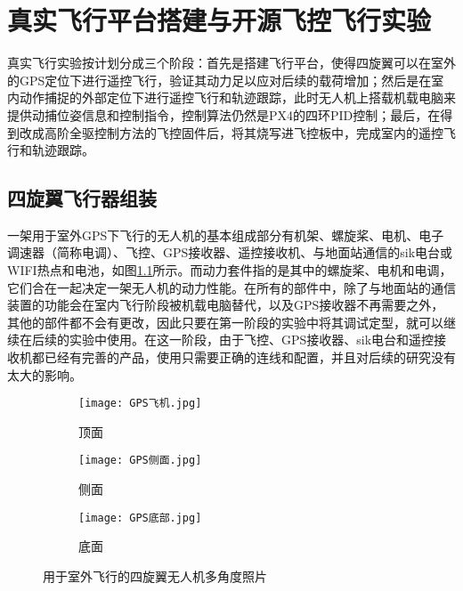 \chapter{真实飞行平台搭建与开源飞控飞行实验}
真实飞行实验按计划分成三个阶段：首先是搭建飞行平台，使得四旋翼可以在室外的GPS定位下进行遥控飞行，验证其动力足以应对后续的载荷增加；然后是在室内动作捕捉的外部定位下进行遥控飞行和轨迹跟踪，此时无人机上搭载机载电脑来提供动捕位姿信息和控制指令，控制算法仍然是PX4的四环PID控制；最后，在得到改成高阶全驱控制方法的飞控固件后，将其烧写进飞控板中，完成室内的遥控飞行和轨迹跟踪。
\section{四旋翼飞行器组装}
一架用于室外GPS下飞行的无人机的基本组成部分有机架、螺旋桨、电机、电子调速器（简称电调）、飞控、GPS接收器、遥控接收机、与地面站通信的sik电台或WIFI热点和电池，如图\ref{用于室外飞行的四旋翼无人机多角度照片}所示。而动力套件指的是其中的螺旋桨、电机和电调，它们合在一起决定一架无人机的动力性能。在所有的部件中，除了与地面站的通信装置的功能会在室内飞行阶段被机载电脑替代，以及GPS接收器不再需要之外，其他的部件都不会有更改，因此只要在第一阶段的实验中将其调试定型，就可以继续在后续的实验中使用。在这一阶段，由于飞控、GPS接收器、sik电台和遥控接收机都已经有完善的产品，使用只需要正确的连线和配置，并且对后续的研究没有太大的影响。
\begin{figure}[h]
  \centering
  \begin{subfigure}[c]{0.33\textwidth}
    \centering
    \texttt{[image: GPS飞机.jpg]}
    \caption{顶面}
  \end{subfigure} \hfill
  \begin{subfigure}[c]{0.33\textwidth}
    \centering
    \texttt{[image: GPS侧面.jpg]}
    \caption{侧面}
  \end{subfigure}\hfill
    \begin{subfigure}[c]{0.33\textwidth}
      \centering
      \texttt{[image: GPS底部.jpg]}
      \caption{底面}
  \end{subfigure}
  \caption{用于室外飞行的四旋翼无人机多角度照片}
  \label{用于室外飞行的四旋翼无人机多角度照片}
  \end{figure}

